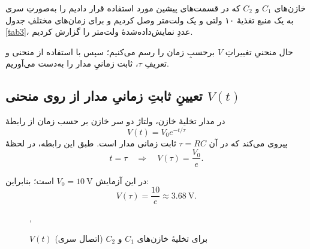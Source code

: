 \documentclass[a4paper, 11pt]{article}
\begin{document}
خازن‌های $C_1$ و $C_2$ که در قسمت‌های پیشین مورد استفاده قرار دادیم را به‌صورتِ سری به یک منبع تغذیهٔ ۱۰ ولتی و یک ولت‌متر وصل کردیم و برای زمان‌های مختلفِ جدول \ref{tab3}، عددِ نمایش‌داده‌شدهٔ ولت‌متر را گزارش کردیم.


حال منحنیِ تغییراتِ $V$ برحسبِ زمان را رسم می‌کنیم؛ سپس با استفاده از منحنی و تعریفِ $\tau$، ثابت زمانیِ مدار را به‌دست می‌آوریم.

\subsection*{تعیینِ ثابتِ زمانیِ مدار از روی منحنی $V(t)$}

در مدار تخلیهٔ خازن، ولتاژ دو سر خازن بر حسب زمان از رابطهٔ
\begin{equation}
V(t) = V_0 e^{-t/\tau}
\end{equation}
پیروی می‌کند که در آن $\tau = RC$ ثابت زمانی مدار است. طبق این رابطه، در لحظهٔ
\begin{equation}
t = \tau \quad \Rightarrow \quad V(\tau) = \frac{V_0}{e}.
\end{equation}

در این آزمایش $V_0 = 10~\mathrm{V}$ است؛ بنابراین:
\begin{equation}
V(\tau) = \frac{10}{e} \approx 3.68~\mathrm{V}.
\end{equation}

\begin{figure}[h!]
\caption{{$V(t)$ برای تخلیهٔ خازن‌های $C_1$ و $C_2$ (اتصال سری)}},
\label{fig3}
\centering
{}
\end{figure}
\end{document}
